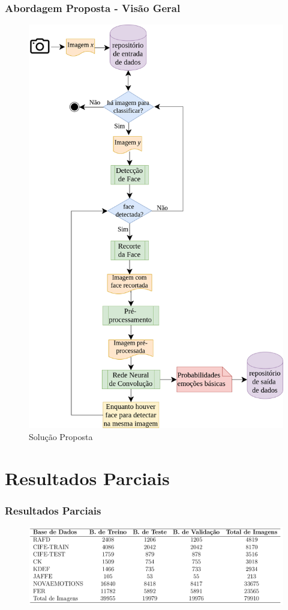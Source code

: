 \documentclass{beamer}
\begin{document}
\begin{frame}
\frametitle{Abordagem Proposta - Visão Geral}
\begin{figure}
\centering
\includegraphics[scale=0.17]{figuras/arquitetura.png}
\caption{Solução Proposta}
\label{fig:arquitetura}
\end{figure}
\end{frame}


\section{Resultados Parciais}
\begin{frame}
\frametitle{Resultados Parciais}
\begin{figure}
\centering
\includegraphics[scale=0.26]{figuras/tabela_dados.png}
\label{fig:arquitetura}
\end{figure}
\end{frame}
\end{document}
